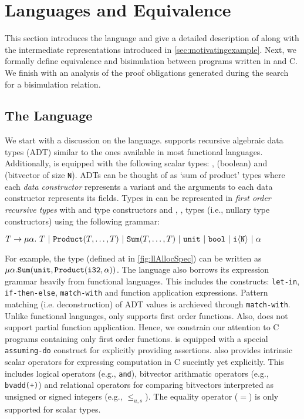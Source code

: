 \section{Languages and Equivalence}
\label{sec:lang-eqdef}

This section introduces the \SpecL{} language and give a detailed description of \SpecL{} along
with the intermediate representations introduced in \cref{sec:motivatingexample}.
Next, we formally define equivalence and bisimulation between programs written in \SpecL{} and C.
We finish with an analysis of the proof obligations generated during the search for a bisimulation relation.

\subsection{The \SpecL{} Language}
\label{sec:speclang}
We start with a discussion on the \SpecL{} language.
\SpecL{} supports recursive algebraic data types (ADT) similar to the ones available in most functional languages.
Additionally, \SpecL{} is equipped with the following scalar types: ,  (boolean) and  (bitvector of size {\tt N}).
ADTs can be thought of as `sum of product' types where each {\em data constructor} represents a variant
and the arguments to each data constructor represents its fields.
Types in \SpecL{} can be represented in {\em first order recursive types} with  and  type constructors
and , ,  types (i.e., nullary type constructors) using the following grammar:

$T \rightarrow \mu \alpha.\ T \ |\  \type{Product}(T,\dots,T) \ |\  \type{Sum}(T,\dots,T) \ |\  \type{unit} \ |\ \type{bool} \ |\  \type{i\langle N \rangle} \ |\  \alpha$

For example, the  type (defined at  in \cref{fig:llAllocSpec}) can be written as $\mu \alpha. {\tt Sum}({\tt unit}, {\tt Product}({\tt i32},\alpha))$.
The language also borrows its expression grammar heavily from functional languages.
This includes the constructs: {\tt let-in}, {\tt if-then-else}, {\tt match-with} and function application expressions.
Pattern matching (i.e. deconstruction) of ADT values is archieved through {\tt match-with}.
Unlike functional languages, \SpecL{} only supports first order functions.
Also, \SpecL{} does not support partial function application.
Hence, we constrain our attention to C programs containing only first order functions.
\SpecL{} is equipped with a special {\tt assuming-do} construct for explicitly providing assertions.
\SpecL{} also provides intrinsic scalar operators for expressing computation in C succintly yet explicitly.
This includes logical operators (e.g., {\tt and}), bitvector arithmatic operators (e.g., {\tt bvadd(+)}) and
relational operators for comparing bitvectors interpreted as unsigned or signed integers (e.g., {\tt $\leq_{u,s}$}).
The equality operator ($=$) is only supported for scalar types.

